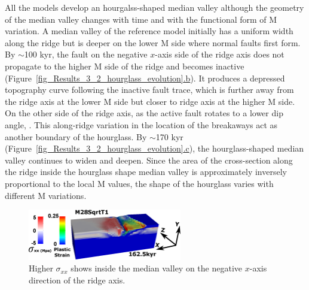 All the models develop an hourgalss-shaped median valley although the geometry of the median valley changes with time and with the functional form of M variation. %
A median valley of the reference model initially has a uniform width along the ridge but is deeper on the lower M side where normal faults first form. By $\sim$100 kyr, the fault on the negative $x$-axis side of the ridge axis does not propagate to the higher M side of the ridge and becomes inactive (Figure~\hyperref[fig_Results_3_2_hourglass_evolution]{\ref{fig_Results_3_2_hourglass_evolution}.b}). It produces a depressed topography curve following the inactive fault trace, which is further away from the ridge axis at the lower M side but closer to ridge axis at the higher M side. On the other side of the ridge axis, as the active fault rotates to a lower dip angle, . This along-ridge variation in the location of the breakaways act as another boundary of the hourglass. %
By $\sim$170 kyr (Figure~\hyperref[fig_Results_3_2_hourglass_evolution]{\ref{fig_Results_3_2_hourglass_evolution}.c}), the hourglass-shaped median valley continues to widen and deepen. Since the area of the cross-section along the ridge inside the hourglass shape median valley is approximately inversely proportional to the local M values, the shape of the hourglass varies with different M variations.

\begin{figure}[h]
  \centering
    \includegraphics[width=0.6\textwidth]{./Figures/fig_Results4_7_sqrt_cut_back_conjugate_Sxx.eps}
  \caption{Higher $\sigma_{xx}$ shows inside the median valley on the negative $x$-axis direction of the ridge axis. }
 \label{fig_Results4_7}
\end{figure}

